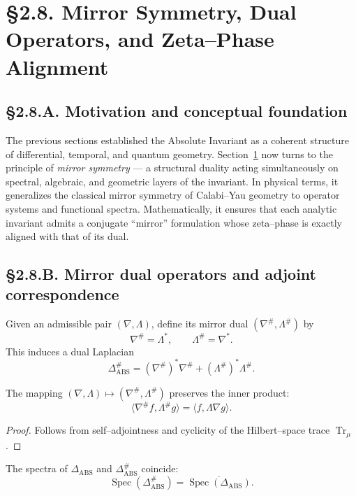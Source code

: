 \section{§2.8. Mirror Symmetry, Dual Operators, and Zeta–Phase Alignment}
\label{sec:2.8-mirror}

\subsection*{§2.8.A. Motivation and conceptual foundation}

The previous sections established the Absolute Invariant as a coherent structure of differential, temporal, and quantum geometry.
Section~\ref{sec:2.8-mirror} now turns to the principle of \emph{mirror symmetry} — a structural duality acting simultaneously on spectral, algebraic, and geometric layers of the invariant.
In physical terms, it generalizes the classical mirror symmetry of Calabi–Yau geometry to operator systems and functional spectra.
Mathematically, it ensures that each analytic invariant admits a conjugate “mirror” formulation whose zeta–phase is exactly aligned with that of its dual.

\subsection*{§2.8.B. Mirror dual operators and adjoint correspondence}

\begin{definition}
Given an admissible pair $(\nabla,\Lambda)$, define its mirror dual $(\nabla^\#, \Lambda^\#)$ by
\[
\nabla^\# = \Lambda^\ast, \qquad \Lambda^\# = \nabla^\ast.
\]
This induces a dual Laplacian
\[
\Delta_{\mathrm{ABS}}^\# = (\nabla^\#)^\ast\nabla^\# + (\Lambda^\#)^\ast \Lambda^\#.
\]
\]
\end{definition}

\begin{lemma}
The mapping $(\nabla,\Lambda)\mapsto(\nabla^\#,\Lambda^\#)$ preserves the inner product:
\[
\langle \nabla^\# f, \Lambda^\# g\rangle = \langle f, \Lambda\nabla g\rangle.
\]
\]
\end{lemma}

\begin{proof}
Follows from self–adjointness and cyclicity of the Hilbert–space trace $\operatorname{Tr}_\mu$.
\end{proof}

\begin{theorem}\label{thm:2.8.spec}
The spectra of $\Delta_{\mathrm{ABS}}$ and $\Delta_{\mathrm{ABS}}^\#$ coincide:
\[
\operatorname{Spec}(\Delta_{\mathrm{ABS}}^\#) = \overline{\operatorname{Spec}(\Delta_{\mathrm{ABS}})}.
\]
\]
\end{theorem}

